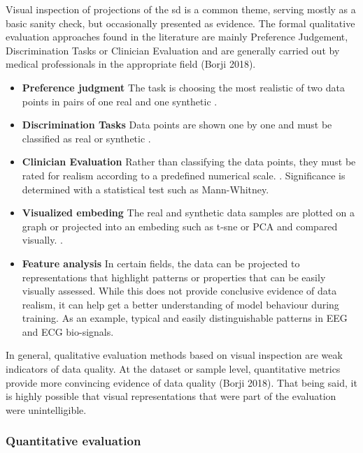             Visual inspection of projections of the \gls{sd} is a common theme, serving mostly as a basic sanity check, but occasionally presented as evidence. The formal qualitative evaluation approaches found in the literature are mainly Preference Judgement, Discrimination Tasks or Clinician Evaluation and are generally carried out by medical professionals in the appropriate field (Borji 2018).
                \begin{itemize}
                    \item \textbf{Preference judgment} The task is choosing the most realistic of two data points in pairs of one real and one synthetic \cite{Choi2017-nt}.
                    \item \textbf{Discrimination Tasks} Data points are shown one by one and must be classified as real or synthetic \cite{Beaulieu-Jones2019-ct}.
                    \item \textbf{Clinician Evaluation} Rather than classifying the data points, they must be rated for realism according to a predefined numerical scale. \cite{Beaulieu-Jones2019-ct}. Significance is determined with a statistical test such as Mann-Whitney.
                    \item \textbf{Visualized embeding} The real and synthetic data samples are plotted on a graph or projected into an embeding such as \gls{t-sne} or PCA and compared visually. \cite{cui2019conan, yu2019rare, zhu_2020, yale2019ESANN, Yang_2019_ehr,Beaulieu-Jones2019-ct, tanti2019, dash2019synthetic}.
                    \item \textbf{Feature analysis} In certain fields, the data can be projected to representations that highlight patterns or properties that can be easily visually assessed. While this does not provide conclusive evidence of data realism, it can help get a better understanding of model behaviour during training. As an example, typical and easily distinguishable patterns in EEG and ECG bio-signals. \cite{Harada2019}
                \end{itemize}
    
        In general, qualitative evaluation methods based on visual inspection are weak indicators of data quality. At the dataset or sample level, quantitative metrics provide more convincing evidence of data quality (Borji 2018). That being said, it is highly possible that visual representations that were part of the evaluation were unintelligible.
        
        \subsubsection{Quantitative evaluation}
        
